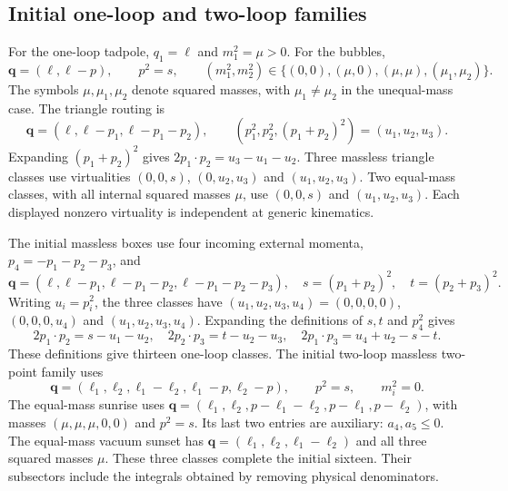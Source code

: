 \subsection{Initial one-loop and two-loop families}
For the one-loop tadpole, $q_1=\ell$ and $m_1^2=\mu>0$. For the bubbles,
\begin{equation}
 \boldsymbol q=(\ell,\ell-p),\qquad p^2=s,
 \qquad (m_1^2,m_2^2)\in\{(0,0),(\mu,0),(\mu,\mu),(\mu_1,\mu_2)\}.
\end{equation}
The symbols $\mu,\mu_1,\mu_2$ denote squared masses, with $\mu_1\ne\mu_2$ in the unequal-mass case. The triangle routing is
\begin{equation}
 \boldsymbol q=(\ell,\ell-p_1,\ell-p_1-p_2),\qquad
 (p_1^2,p_2^2,(p_1+p_2)^2)=(u_1,u_2,u_3).
\end{equation}
Expanding $(p_1+p_2)^2$ gives $2p_1\cdot p_2=u_3-u_1-u_2$. Three massless triangle classes use virtualities $(0,0,s)$, $(0,u_2,u_3)$ and $(u_1,u_2,u_3)$. Two equal-mass classes, with all internal squared masses $\mu$, use $(0,0,s)$ and $(u_1,u_2,u_3)$. Each displayed nonzero virtuality is independent at generic kinematics.

The initial massless boxes use four incoming external momenta, $p_4=-p_1-p_2-p_3$, and
\begin{equation}
 \boldsymbol q=(\ell,\ell-p_1,\ell-p_1-p_2,\ell-p_1-p_2-p_3),
 \quad s=(p_1+p_2)^2,\quad t=(p_2+p_3)^2.
\end{equation}
Writing $u_i=p_i^2$, the three classes have $(u_1,u_2,u_3,u_4)=(0,0,0,0)$, $(0,0,0,u_4)$ and $(u_1,u_2,u_3,u_4)$. Expanding the definitions of $s,t$ and $p_4^2$ gives
\begin{equation}
 2p_1\cdot p_2=s-u_1-u_2,\quad
 2p_2\cdot p_3=t-u_2-u_3,\quad
 2p_1\cdot p_3=u_4+u_2-s-t.
\end{equation}
These definitions give thirteen one-loop classes. The initial two-loop massless two-point family uses
\begin{equation}
 \boldsymbol q=(\ell_1,\ell_2,\ell_1-\ell_2,\ell_1-p,\ell_2-p),
 \qquad p^2=s,\qquad m_i^2=0.
\end{equation}
The equal-mass sunrise uses $\boldsymbol q=(\ell_1,\ell_2,p-\ell_1-\ell_2,p-\ell_1,p-\ell_2)$, with masses $(\mu,\mu,\mu,0,0)$ and $p^2=s$. Its last two entries are auxiliary: $a_4,a_5\leq0$. The equal-mass vacuum sunset has $\boldsymbol q=(\ell_1,\ell_2,\ell_1-\ell_2)$ and all three squared masses $\mu$. These three classes complete the initial sixteen. Their subsectors include the integrals obtained by removing physical denominators.

